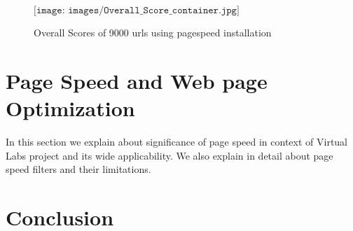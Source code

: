 \documentclass[a4paper,10pt]{IEEEtran}
\begin{document}
\begin{figure}[ht]
 \centering
$\texttt{[image: images/Overall\_Score\_container.jpg]}$
\caption{Overall Scores of 9000 urls using pagespeed installation}
\label{fig2}
\end{figure}

\section{Page Speed and Web page Optimization}
In this section we explain about significance of page speed in context of Virtual Labs project and its wide applicability. We also explain
in detail about page speed filters and their limitations. 

\section{Conclusion}
\end{document}
